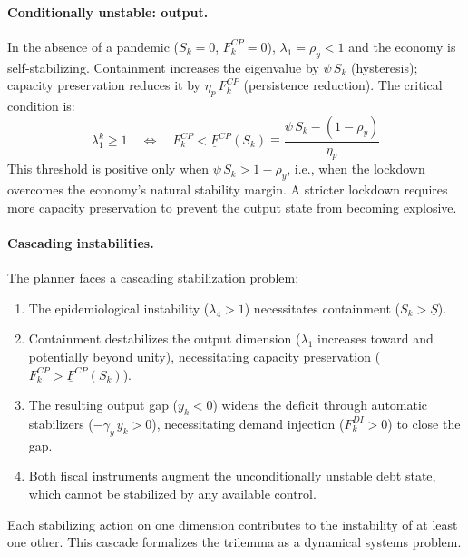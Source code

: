 \documentclass[12pt, a4paper]{article}
\begin{document}
\paragraph{Conditionally unstable: output.}
In the absence of a pandemic ($S_k = 0$, $F_k^{CP} = 0$), $\lambda_1 = \rho_y
< 1$ and the economy is self-stabilizing. Containment increases the eigenvalue
by $\psi\, S_k$ (hysteresis); capacity preservation reduces it by
$\eta_p\, F_k^{CP}$ (persistence reduction). The critical condition is:
%
\begin{equation}
    \lambda_1^k \geq 1
    \quad\Longleftrightarrow\quad
    F_k^{CP} < \underline{F}^{CP}(S_k) \equiv
    \frac{\psi\, S_k - (1 - \rho_y)}{\eta_p}
    \label{eq:CP_threshold}
\end{equation}
%
This threshold is positive only when $\psi\, S_k > 1 - \rho_y$, i.e., when the
lockdown overcomes the economy's natural stability margin. A stricter lockdown
requires more capacity preservation to prevent the output state from becoming
explosive.

\paragraph{Cascading instabilities.}
The planner faces a cascading stabilization problem:
\begin{enumerate}
    \item The epidemiological instability ($\lambda_4 > 1$) necessitates
    containment ($S_k > \underline{S}$).

    \item Containment destabilizes the output dimension ($\lambda_1$ increases
    toward and potentially beyond unity), necessitating capacity preservation
    ($F_k^{CP} > \underline{F}^{CP}(S_k)$).

    \item The resulting output gap ($y_k < 0$) widens the deficit through
    automatic stabilizers ($-\gamma_y\, y_k > 0$), necessitating demand
    injection ($F_k^{DI} > 0$) to close the gap.

    \item Both fiscal instruments augment the unconditionally unstable debt
    state, which cannot be stabilized by any available control.
\end{enumerate}
%
Each stabilizing action on one dimension contributes to the instability of at
least one other. This cascade formalizes the trilemma as a dynamical systems
problem.

\end{document}
